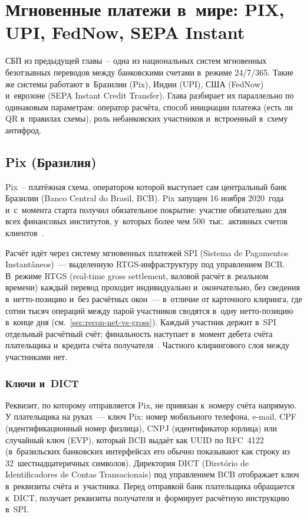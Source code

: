 \chapter{Мгновенные платежи в~мире: PIX, UPI, FedNow, SEPA Instant}\label{ch:instant-payments-world}

СБП из предыдущей главы~-- одна из национальных систем мгновенных
безотзывных переводов между банковскими счетами в~режиме 24/7/365.
Такие же системы работают в~Бразилии (Pix), Индии (UPI), США (FedNow)
и~еврозоне (SEPA Instant Credit Transfer). Глава разбирает их
параллельно по одинаковым параметрам: оператор расчёта, способ
инициации платежа (есть ли QR в~правилах схемы), роль небанковских
участников и~встроенный в~схему антифрод.

\section{Pix (Бразилия)}\label{sec:pix-system}

Pix~-- платёжная схема, оператором которой выступает сам центральный
банк Бразилии (Banco Central do Brasil, BCB). Pix запущен 16 ноября
2020~года и~с~момента старта получил обязательное покрытие: участие
обязательно для всех финансовых институтов, у~которых более чем
500~тыс.\ активных счетов клиентов~\cite{pix,pix-participants}.

Расчёт идёт через систему мгновенных платежей SPI (Sistema de Pagamentos
Instantâneos)~--- выделенную RTGS-инфраструктуру под управлением BCB. В~режиме RTGS (real-time
gross settlement, валовой расчёт в~реальном времени) каждый перевод
проходит индивидуально и~окончательно, без сведения в~нетто-позицию
и~без расчётных окон~--- в~отличие от карточного клиринга, где сотни
тысяч операций между парой участников сводятся в~одну нетто-позицию
в~конце дня (см.~\ref{sec:recon-net-vs-gross}). Каждый участник держит
в~SPI отдельный расчётный счёт; финальность наступает в~момент
дебета счёта плательщика и~кредита счёта получателя~\cite{pix-spi}.
Частного клирингового слоя между участниками нет.

\subsection*{Ключи и~DICT}\label{subsec:pix-keys-dict}

Реквизит, по которому отправляется Pix, не привязан к~номеру счёта
напрямую. У плательщика на руках~--- ключ Pix: номер мобильного
телефона, e-mail, CPF (идентификационный номер физлица), CNPJ
(идентификатор юрлица) или случайный ключ (EVP), который BCB
выдаёт как UUID по RFC~4122 (в~бразильских банковских интерфейсах
его обычно показывают как строку из 32~шестнадцатеричных символов).
Директория DICT (Diretório de Identificadores de Contas Transacionais)
под управлением BCB отображает ключ в~реквизиты счёта и~участника. Перед отправкой банк плательщика обращается
к~DICT, получает реквизиты получателя и~формирует расчётную
инструкцию в~SPI.

